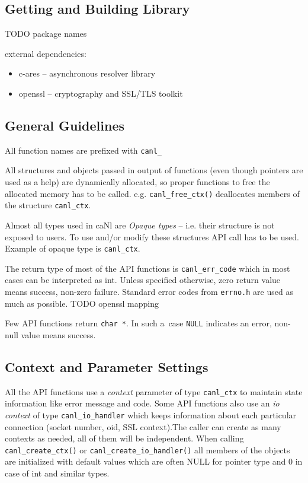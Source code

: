 \subsection{Getting and Building Library}
TODO package names

external dependencies:
\begin{itemize}
\item c-ares -- asynchronous resolver library
\item openssl -- cryptography and SSL/TLS toolkit
\end{itemize}

\subsection{General Guidelines}

%
All function names are prefixed with \verb'canl_'

%
All structures and objects passed in output of functions
(even though pointers are used as a help)
are dynamically allocated, so proper functions to free the allocated 
memory has to be called. e.g. \verb'canl_free_ctx()' 
deallocates members of the structure \verb'canl_ctx'.

%
Almost all types used in caNl are \textit{Opaque types} -- i.e. their structure is 
not exposed to users. To use and/or modify these structures API call has 
to be used. Example of opaque type is {\tt canl\_ctx}.

%
The return type of most of the API functions is {\tt canl\_err\_code} which
 in most cases can be interpreted as int. Unless specified otherwise, zero
return value means success, non-zero failure. Standard error codes from 
{\tt errno.h} are used as much as possible.
TODO openssl mapping

Few API functions return {\tt char *}. In such a~case
{\tt NULL} indicates an error, non-null value means success.

\subsection{Context and Parameter Settings}
\label{s:context}
All the API functions use a \emph{context} parameter of type {\tt canl\_ctx} 
to maintain state information like error message and code. 
Some API functions also use an \emph{io context} of type {\tt canl\_io\_handler}
which keeps information about each particular connection 
(\eg socket number, oid, SSL context).The caller can create as many 
contexts as needed, all of them will be independent. When calling
\verb'canl_create_ctx()' or \verb'canl_create_io_handler()' all members 
of the objects are initialized with default values which are often 
NULL for pointer type and 0 in case of int and similar types.

